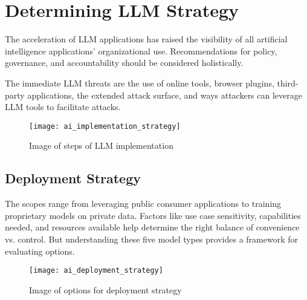 \headerimage
\chapter{Determining LLM Strategy}
The acceleration of LLM applications has raised the visibility of all
artificial intelligence applications' organizational use. Recommendations for
policy, governance, and accountability should be considered holistically.

The immediate LLM threats are the use of online tools, browser plugins,
third-party applications, the extended attack surface, and ways attackers can
leverage LLM tools to facilitate attacks.

\begin{figure}[h]
  \centering
  \texttt{[image: ai\_implementation\_strategy]}
  \caption{Image of steps of LLM implementation}
  \label{fig:llm-implementation-strategy}
\end{figure}

\clearpage
\section{Deployment Strategy}
The scopes range from leveraging public consumer applications to training
proprietary models on private data. Factors like use case sensitivity,
capabilities needed, and resources available help determine the right balance
of convenience vs. control. But understanding these five model types provides a
framework for evaluating options.

\begin{figure}[h]
  \centering
  \texttt{[image: ai\_deployment\_strategy]}
  \caption{Image of options for deployment strategy}
  \label{fig:llm-deployment-strategy}
\end{figure}